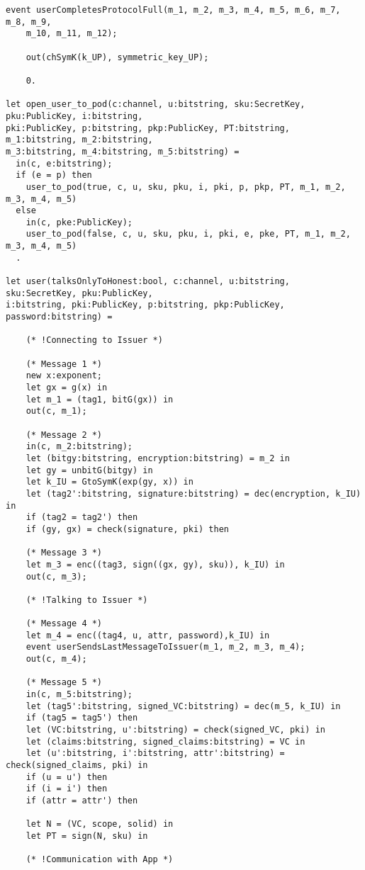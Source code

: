 \begin{Verbatim}[fontsize=\small]
    event userCompletesProtocolFull(m_1, m_2, m_3, m_4, m_5, m_6, m_7, m_8, m_9, 
    m_10, m_11, m_12);

    out(chSymK(k_UP), symmetric_key_UP);

    0.

let open_user_to_pod(c:channel, u:bitstring, sku:SecretKey, pku:PublicKey, i:bitstring,
pki:PublicKey, p:bitstring, pkp:PublicKey, PT:bitstring, m_1:bitstring, m_2:bitstring,
m_3:bitstring, m_4:bitstring, m_5:bitstring) =
  in(c, e:bitstring);
  if (e = p) then
    user_to_pod(true, c, u, sku, pku, i, pki, p, pkp, PT, m_1, m_2, m_3, m_4, m_5)
  else
    in(c, pke:PublicKey);
    user_to_pod(false, c, u, sku, pku, i, pki, e, pke, PT, m_1, m_2, m_3, m_4, m_5)
  .

let user(talksOnlyToHonest:bool, c:channel, u:bitstring, sku:SecretKey, pku:PublicKey, 
i:bitstring, pki:PublicKey, p:bitstring, pkp:PublicKey, password:bitstring) =

    (* !Connecting to Issuer *)

    (* Message 1 *)
    new x:exponent;
    let gx = g(x) in
    let m_1 = (tag1, bitG(gx)) in
    out(c, m_1);

    (* Message 2 *)
    in(c, m_2:bitstring);
    let (bitgy:bitstring, encryption:bitstring) = m_2 in
    let gy = unbitG(bitgy) in
    let k_IU = GtoSymK(exp(gy, x)) in
    let (tag2':bitstring, signature:bitstring) = dec(encryption, k_IU) in
    if (tag2 = tag2') then
    if (gy, gx) = check(signature, pki) then

    (* Message 3 *)
    let m_3 = enc((tag3, sign((gx, gy), sku)), k_IU) in
    out(c, m_3);

    (* !Talking to Issuer *)

    (* Message 4 *)
    let m_4 = enc((tag4, u, attr, password),k_IU) in
    event userSendsLastMessageToIssuer(m_1, m_2, m_3, m_4);
    out(c, m_4);

    (* Message 5 *)
    in(c, m_5:bitstring);
    let (tag5':bitstring, signed_VC:bitstring) = dec(m_5, k_IU) in
    if (tag5 = tag5') then
    let (VC:bitstring, u':bitstring) = check(signed_VC, pki) in
    let (claims:bitstring, signed_claims:bitstring) = VC in
    let (u':bitstring, i':bitstring, attr':bitstring) = check(signed_claims, pki) in
    if (u = u') then
    if (i = i') then
    if (attr = attr') then

    let N = (VC, scope, solid) in
    let PT = sign(N, sku) in

    (* !Communication with App *)


\end{Verbatim}
